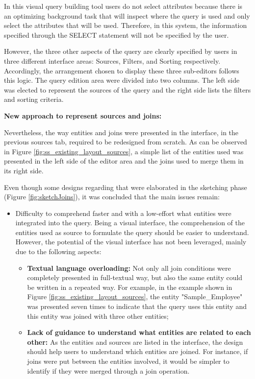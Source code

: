 In this visual query building tool users do not select attributes because there is an optimizing background task that will inspect where the query is used and only select the attributes that will be used. Therefore, in this system, the information specified through the SELECT statement will not be specified by the user.

However, the three other aspects of the query are clearly specified by users in three different interface areas: Sources, Filters, and Sorting respectively. Accordingly, the arrangement chosen to display these three sub-editors follows this logic. The query edition area were divided into two columns. The left side was elected to represent the sources of the query and the right side lists the filters and sorting criteria.

\medskip

\textbf{New approach to represent sources and joins:}

\medskip

Nevertheless, the way entities and joins were presented in the interface, in the previous sources tab, required to be redesigned from scratch. As can be observed in Figure \ref{fig:ss_existing_layout_sources}, a simple list of the entities used was presented in the left side of the editor area and the joins used to merge them in its right side.

Even though some designs regarding that were elaborated in the sketching phase (Figure \ref{fig:sketchJoins}), it was concluded that the main issues remain:

\begin{itemize}
  \item Difficulty to comprehend faster and with a low-effort what entities were integrated into the query. Being a visual interface, the comprehension of the entities used as source to formulate the query should be easier to understand. However, the potential of the visual interface has not been leveraged, mainly due to the following aspects:
  \begin{itemize} 
    \item \textbf{Textual language overloading: }Not only all join conditions were completely presented in full-textual way, but also the same entity could be written in a repeated way. For example, in the example shown in Figure \ref{fig:ss_existing_layout_sources}, the entity "Sample\_Employee" was presented seven times to indicate that the query uses this entity and this entity was joined with three other entities;
    \item \textbf{Lack of guidance to understand what entities are related to each other: }As the entities and sources are listed in the interface, the design should help users to understand which entities are joined. For instance, if joins were put between the entities involved, it would be simpler to identify if they were merged through a join operation.
  \end{itemize}
\end{itemize}

